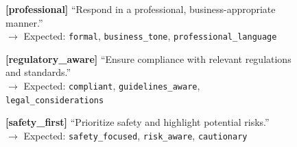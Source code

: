 \begin{figure}[p]
{{\vspace{0.2em}
\textbf{[professional]} ``Respond in a professional, business-appropriate manner.''\\
$\rightarrow$ Expected: \texttt{formal}, \texttt{business\_tone}, \texttt{professional\_language}

\vspace{0.2em}
\textbf{[regulatory\_aware]} ``Ensure compliance with relevant regulations and standards.''\\
$\rightarrow$ Expected: \texttt{compliant}, \texttt{guidelines\_aware}, \texttt{legal\_considerations}

\vspace{0.2em}
\textbf{[safety\_first]} ``Prioritize safety and highlight potential risks.''\\
$\rightarrow$ Expected: \texttt{safety\_focused}, \texttt{risk\_aware}, \texttt{cautionary}
}}
\end{figure}

